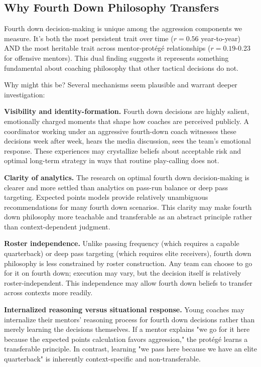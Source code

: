 \documentclass[11pt,twocolumn]{article}
\begin{document}
\subsection{Why Fourth Down Philosophy Transfers}

Fourth down decision-making is unique among the aggression components we measure. It's both the most persistent trait over time ($r=0.56$ year-to-year) AND the most heritable trait across mentor-protégé relationships ($r=0.19$-0.23 for offensive mentors). This dual finding suggests it represents something fundamental about coaching philosophy that other tactical decisions do not.

Why might this be? Several mechanisms seem plausible and warrant deeper investigation:

\textbf{Visibility and identity-formation.} Fourth down decisions are highly salient, emotionally charged moments that shape how coaches are perceived publicly. A coordinator working under an aggressive fourth-down coach witnesses these decisions week after week, hears the media discussion, sees the team's emotional response. These experiences may crystallize beliefs about acceptable risk and optimal long-term strategy in ways that routine play-calling does not.

\textbf{Clarity of analytics.} The research on optimal fourth down decision-making is clearer and more settled than analytics on pass-run balance or deep pass targeting. Expected points models provide relatively unambiguous recommendations for many fourth down scenarios. This clarity may make fourth down philosophy more teachable and transferable as an abstract principle rather than context-dependent judgment.

\textbf{Roster independence.} Unlike passing frequency (which requires a capable quarterback) or deep pass targeting (which requires elite receivers), fourth down philosophy is less constrained by roster construction. Any team can choose to go for it on fourth down; execution may vary, but the decision itself is relatively roster-independent. This independence may allow fourth down beliefs to transfer across contexts more readily.

\textbf{Internalized reasoning versus situational response.} Young coaches may internalize their mentors' reasoning process for fourth down decisions rather than merely learning the decisions themselves. If a mentor explains "we go for it here because the expected points calculation favors aggression," the protégé learns a transferable principle. In contrast, learning "we pass here because we have an elite quarterback" is inherently context-specific and non-transferable.
\end{document}
